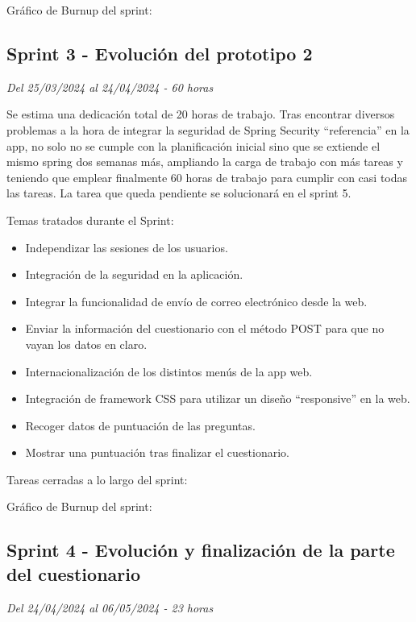 Gráfico de Burnup del sprint:

\clearpage
\subsection{Sprint 3 - Evolución del prototipo 2}
\textit{Del 25/03/2024 al 24/04/2024 - 60 horas}

Se estima una dedicación total de 20 horas de trabajo.
Tras encontrar diversos problemas a la hora de integrar la seguridad de Spring Security ``referencia'' en la app, no solo no se cumple con la planificación inicial sino que se extiende el mismo spring dos semanas más, ampliando la carga de trabajo con más tareas y teniendo que emplear finalmente 60 horas de trabajo para cumplir con casi todas las tareas.
La tarea que queda pendiente se solucionará en el sprint 5.

Temas tratados durante el Sprint:
\begin{itemize}
	\item
	Independizar las sesiones de los usuarios.
	\item
	Integración de la seguridad en la aplicación.
	\item
	Integrar la funcionalidad de envío de correo electrónico desde la web.
	\item
	Enviar la información del cuestionario con el método POST para que no vayan los datos en claro.
	\item
	Internacionalización de los distintos menús de la app web.
	\item
	Integración de framework CSS para utilizar un diseño ``responsive'' en la web.
	\item
	Recoger datos de puntuación de las preguntas.
	\item
	Mostrar una puntuación tras finalizar el cuestionario.
\end{itemize}
\clearpage
Tareas cerradas a lo largo del sprint:

Gráfico de Burnup del sprint:

\clearpage
\subsection{Sprint 4 - Evolución y finalización de la parte del cuestionario}
\textit{Del 24/04/2024 al 06/05/2024 - 23 horas}

